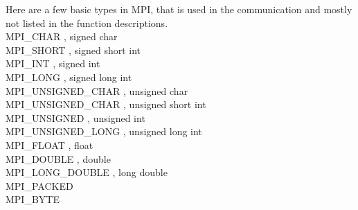 \documentclass[a4paper,norsk,11pt,twoside]{report}
\begin{document}
Here are a few basic types in MPI, that is used in the communication and mostly not listed in the function descriptions. \\

MPI\_CHAR , signed char \\

MPI\_SHORT , signed short int \\

MPI\_INT , signed int \\

MPI\_LONG , signed long int \\

MPI\_UNSIGNED\_CHAR , unsigned char \\

MPI\_UNSIGNED\_CHAR , unsigned short int \\

MPI\_UNSIGNED , unsigned int \\

MPI\_UNSIGNED\_LONG , unsigned long int \\

MPI\_FLOAT , float \\

MPI\_DOUBLE , double \\

MPI\_LONG\_DOUBLE , long double \\

MPI\_PACKED \\

MPI\_BYTE 








\end{document}

